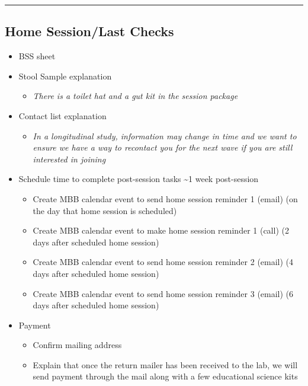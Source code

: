 \documentclass[]{book}
\providecommand{\tightlist}{%
  \setlength{\itemsep}{0pt}\setlength{\parskip}{0pt}}
\begin{document}
\begin{center}\rule{0.5\linewidth}{0.5pt}\end{center}

\hypertarget{home-sessionlast-checks}{%
\subsection{Home Session/Last Checks}\label{home-sessionlast-checks}}

\begin{itemize}
\tightlist
\item
  BSS sheet
\item
  Stool Sample explanation

  \begin{itemize}
  \tightlist
  \item
    \emph{There is a toilet hat and a gut kit in the session package}
  \end{itemize}
\item
  Contact list explanation

  \begin{itemize}
  \tightlist
  \item
    \emph{In a longitudinal study, information may change in time and we want to ensure we have a way to recontact you for the next wave if you are still interested in joining}
  \end{itemize}
\item
  Schedule time to complete post-session tasks \textasciitilde{}1 week post-session

  \begin{itemize}
  \tightlist
  \item
    Create MBB calendar event to send home session reminder 1 (email) (on the day that home session is scheduled)
  \item
    Create MBB calendar event to make home session reminder 1 (call) (2 days after scheduled home session)
  \item
    Create MBB calendar event to send home session reminder 2 (email) (4 days after scheduled home session)
  \item
    Create MBB calendar event to send home session reminder 3 (email) (6 days after scheduled home session)
  \end{itemize}
\item
  Payment

  \begin{itemize}
  \tightlist
  \item
    Confirm mailing address
  \item
    Explain that once the return mailer has been received to the lab, we will send payment through the mail along with a few educational science kits
  \end{itemize}
\end{itemize}
\end{document}
